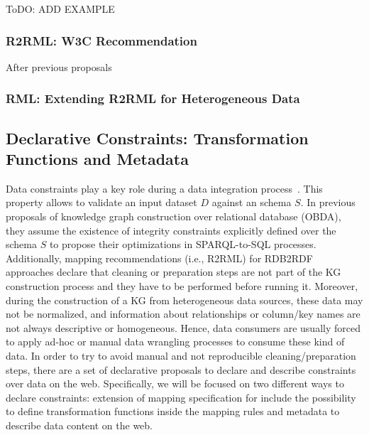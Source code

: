 ToDO: ADD EXAMPLE

\subsubsection{R2RML: W3C Recommendation}
After previous proposals 

\subsubsection{RML: Extending R2RML for Heterogeneous Data}

\subsection{Declarative Constraints: Transformation Functions and Metadata}
Data constraints play a key role during a data integration process~\citep{cali2002data}. This property allows to validate an input dataset $D$ against an schema $S$. In previous proposals of knowledge graph construction over relational database (OBDA), they assume the existence of integrity constraints explicitly defined over the schema $S$ to propose their optimizations in SPARQL-to-SQL processes. Additionally, mapping recommendations (i.e., R2RML) for RDB2RDF approaches declare that cleaning or preparation steps are not part of the KG construction process and they have to be performed before running it. Moreover, during the construction of a KG from heterogeneous data sources, these data may not be normalized, and information about relationships or column/key names are not always descriptive or homogeneous. Hence, data consumers are usually forced to apply ad-hoc or manual data wrangling processes to consume these kind of data. In order to try to avoid manual and not reproducible cleaning/preparation steps, there are a set of declarative proposals to declare and describe constraints over data on the web. Specifically, we will be focused on two different ways to declare constraints: extension of mapping specification for include the possibility to define transformation functions inside the mapping rules and metadata to describe data content on the web. 

